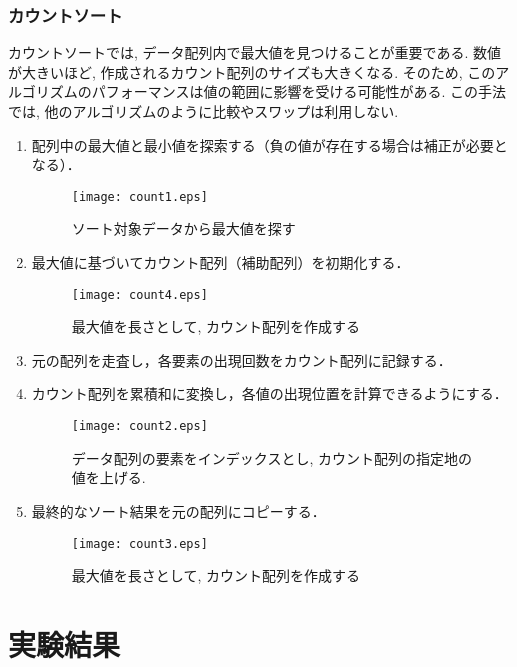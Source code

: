 \documentclass[a4j, 11pt]{jarticle}
\begin{document}
\subsubsection{カウントソート}
カウントソートでは, データ配列内で最大値を見つけることが重要である. 数値が大きいほど, 作成されるカウント配列のサイズも大きくなる. そのため, このアルゴリズムのパフォーマンスは値の範囲に影響を受ける可能性がある. この手法では, 他のアルゴリズムのように比較やスワップは利用しない\cite{gfg:countingsort2024}. \
\begin{enumerate}
  \item 配列中の最大値と最小値を探索する（負の値が存在する場合は補正が必要となる）．
  \begin{figure}[H]
    \centering
    \texttt{[image: count1.eps]}
    \caption{ソート対象データから最大値を探す}
  \end{figure}
  \item 最大値に基づいてカウント配列（補助配列）を初期化する．
  \begin{figure}[H]
    \centering
    \texttt{[image: count4.eps]}
    \caption{最大値を長さとして, カウント配列を作成する}
  \end{figure}
  \item 元の配列を走査し，各要素の出現回数をカウント配列に記録する．
  \item カウント配列を累積和に変換し，各値の出現位置を計算できるようにする．
  \begin{figure}[H]
    \centering
    \texttt{[image: count2.eps]}
    \caption{データ配列の要素をインデックスとし, カウント配列の指定地の値を上げる. }
  \end{figure}
  \newpage
  \item 最終的なソート結果を元の配列にコピーする．
  \begin{figure}[H]
    \centering
    \texttt{[image: count3.eps]}
    \caption{最大値を長さとして, カウント配列を作成する}
  \end{figure}
\end{enumerate}
\newpage
\section{実験結果}
\end{document}
